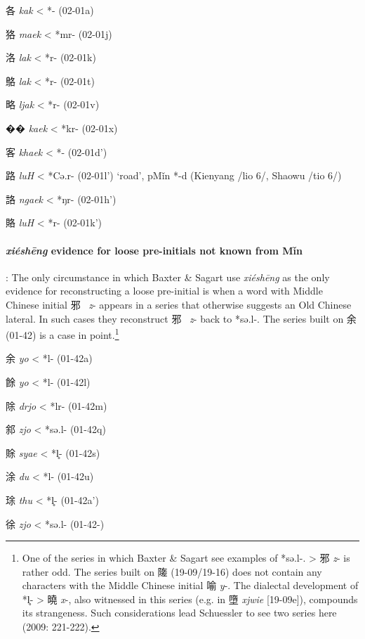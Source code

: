 \begin{description} \item
各  \emph{kak} \textless{} *{}- (02-01a)
\item
狢  \emph{maek} \textless{} *mr{}- (02-01j)
\item
洛  \emph{lak} \textless{} *r{}- (02-01k)
\item
鴼  \emph{lak} \textless{} *r{}- (02-01t)
\item
略  \emph{ljak} \textless{} *r- (02-01v)
\item
�� \emph{kaek} \textless{} *kr{}- (02-01x)
\item
客  \emph{khaek} \textless{} *{}- (02-01d')
\item
路  \emph{luH} \textless{} *Cə.r{}- (02-01l') `road', pMǐn *-d (Kienyang
/lio 6/, Shaowu /t{}io 6/)
\item
詻  \emph{ngaek} \textless{} *ŋr{}- (02-01h')
\item
賂  \emph{luH} \textless{} *r{}- (02-01k')
\end{description}

\paragraph{\emph{xiéshēng}
evidence for loose pre-initials not known from Mǐn}: The only
circumstance in which Baxter \& Sagart use  \emph{xiéshēng} as the only
evidence for reconstructing a loose pre-initial is when a word with
Middle Chinese initial 邪~ \emph{z}- appears in a series that otherwise
suggests an Old Chinese lateral. In such cases they reconstruct
邪~ \emph{z}- back to *sə.l-. The series built on 余 (01-42) is a case in
point.\footnote{One of the series in which Baxter \& Sagart see examples
  of *sə.l-. \textgreater{} 邪 \emph{z}- is rather odd. The series built
  on 隓 (19-09/19-16) does not contain any characters with the Middle
  Chinese initial 喻 \emph{y}-. The dialectal development of *l̥-
  \textgreater{} 曉 \emph{x}-, also witnessed in this series (e.g. in 墮
  \emph{xjwie} {[}19-09e]), compounds its strangeness. Such
  considerations lead Schuessler to see two series here (2009: 221-222).}

\begin{description} \item
余  \emph{yo} \textless{} *l- (01-42a)
\item
餘  \emph{yo} \textless{} *l- (01-42l)
\item
除  \emph{drjo} \textless{} *lr- (01-42m)
\item
䣄  \emph{zjo} \textless{} *sə.l- (01-42q)
\item
賖  \emph{syae} \textless{} *l̥- (01-42s)
\item
涂  \emph{du} \textless{} *l{}- (01-42u)
\item
㻌  \emph{thu} \textless{} *l̥{}- (01-42a')
\item
徐  \emph{zjo} \textless{} *sə.l- (01-42-)
\end{description}

